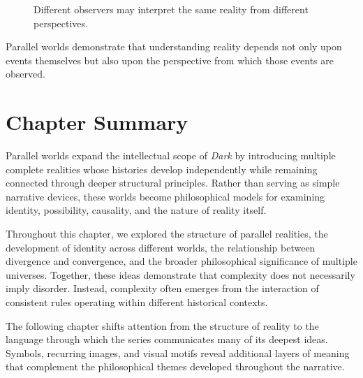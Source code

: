 \documentclass[12pt,oneside,openany]{book}
\begin{document}
\begin{figure}[H]
\centering
{}

\caption{Different observers may interpret the same reality from different perspectives.}
\end{figure}

\begin{tcolorbox}[colback=cyan!6,colframe=cyan!60!black,title=Key Insight]
Parallel worlds demonstrate that understanding reality depends not only upon
events themselves but also upon the perspective from which those events are
observed.
\end{tcolorbox}

\section{Chapter Summary}

Parallel worlds expand the intellectual scope of \textit{Dark} by introducing
multiple complete realities whose histories develop independently while
remaining connected through deeper structural principles. Rather than serving
as simple narrative devices, these worlds become philosophical models for
examining identity, possibility, causality, and the nature of reality itself.

Throughout this chapter, we explored the structure of parallel realities, the
development of identity across different worlds, the relationship between
divergence and convergence, and the broader philosophical significance of
multiple universes. Together, these ideas demonstrate that complexity does not
necessarily imply disorder. Instead, complexity often emerges from the
interaction of consistent rules operating within different historical contexts.

The following chapter shifts attention from the structure of reality to the
language through which the series communicates many of its deepest ideas.
Symbols, recurring images, and visual motifs reveal additional layers of
meaning that complement the philosophical themes developed throughout the
narrative.
\end{document}
